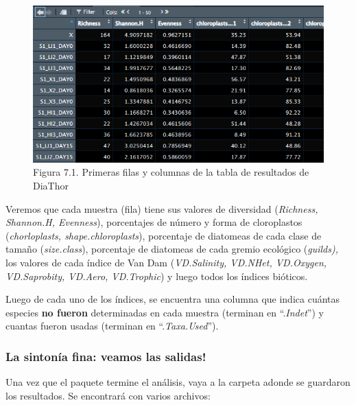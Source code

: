 \documentclass[
]{book}
\begin{document}
\begin{figure}
\centering
\includegraphics{./images/results_diathor.png}
\caption{Figura 7.1. Primeras filas y columnas de la tabla de resultados de DiaThor}
\end{figure}

Veremos que cada muestra (fila) tiene sus valores de diversidad (\emph{Richness, Shannon.H, Evenness}), porcentajes de número y forma de cloroplastos (\emph{chorloplasts, shape.chloroplasts}), porcentaje de diatomeas de cada clase de tamaño (\emph{size.class}), porcentaje de diatomeas de cada gremio ecológico (\emph{guilds),} los valores de cada índice de Van Dam (\emph{VD.Salinity, VD.NHet, VD.Oxygen, VD.Saprobity, VD.Aero, VD.Trophic}) y luego todos los índices bióticos.

Luego de cada uno de los índices, se encuentra una columna que indica cuántas especies \textbf{no fueron} determinadas en cada muestra (terminan en ``.\emph{Indet}'') y cuantas fueron usadas (terminan en ``.\emph{Taxa.Used}'').

\hypertarget{la-sintonuxeda-fina-veamos-las-salidas}{%
\subsubsection{\texorpdfstring{\textbf{La sintonía fina: veamos las salidas!}}{La sintonía fina: veamos las salidas!}}\label{la-sintonuxeda-fina-veamos-las-salidas}}

Una vez que el paquete termine el análisis, vaya a la carpeta adonde se guardaron los resultados. Se encontrará con varios archivos:
\end{document}
